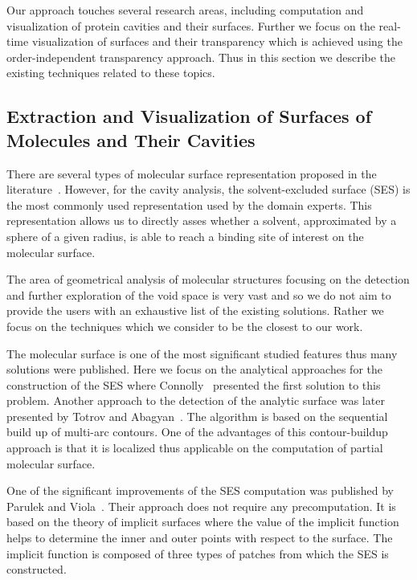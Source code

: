 Our approach touches several research areas, including computation and visualization of protein cavities and their surfaces. 
Further we focus on the real-time visualization of surfaces and their transparency which is achieved using the order-independent transparency approach. 
Thus in this section we describe the existing techniques related to these topics.

\subsection{Extraction and Visualization of Surfaces of Molecules and Their Cavities}
There are several types of molecular surface representation proposed in the literature~\cite{STAR2015}. 
However, for the cavity analysis,  the solvent-excluded surface (SES) is the most commonly used representation used by the domain experts.%
This representation allows us to directly asses whether a solvent, approximated by a sphere of a given radius, is able to reach a binding site of interest on the molecular surface. 

The area of geometrical analysis of molecular structures focusing on the detection and further exploration of the void space is very vast and so we do not aim to provide the users with an exhaustive list of the existing solutions. 
Rather we focus on the techniques which we consider to be the closest to our work.

The molecular surface is one of the most significant studied features thus many solutions were published.
Here we focus on the analytical approaches for the construction of the SES where Connolly~\cite{connolly1983analytical} presented the first solution to this problem.
Another approach to the detection of the analytic surface was later presented by Totrov and Abagyan~\cite{totrov1996contour}.
The algorithm is based on the sequential build up of multi-arc contours. 
One of the advantages of this contour-buildup approach is that it is localized thus applicable on the computation of partial molecular surface.

One of the significant improvements of the SES computation was published by Parulek and Viola~\cite{parulek2012implicit}.
Their approach does not require any precomputation. 
It is based on the theory of implicit surfaces where the value of the implicit function helps to determine the inner and outer points with respect to the surface.
The implicit function is composed of three types of patches from which the SES is constructed.

